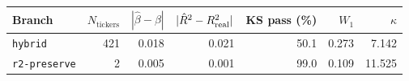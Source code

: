 \begin{tabular}{lrrrrrr}
\toprule
Branch & $N_{\mathrm{tickers}}$ & $|\hat\beta-\beta|$ & $|\hat R^2 - R^2_{\mathrm{real}}|$ & KS pass (\%) & $W_1$ & $\kappa$ \\
\midrule
\texttt{hybrid} & 421 & 0.018 & 0.021 & 50.1 & 0.273 & 7.142 \\
\texttt{r2-preserve} & 2 & 0.005 & 0.001 & 99.0 & 0.109 & 11.525 \\
\bottomrule
\end{tabular}
